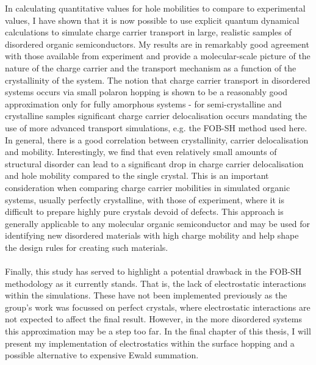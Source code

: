In calculating quantitative values for hole mobilities to compare to experimental values, I have shown that it is now possible to use explicit quantum dynamical calculations to simulate charge carrier transport in large, realistic samples of disordered organic semiconductors. My results are in remarkably good agreement with those available from experiment and provide a molecular-scale picture of the nature of the charge carrier and the transport mechanism as a function of the crystallinity of the system. The notion that charge carrier transport in disordered systems occurs via small polaron hopping is shown to be a reasonably good approximation only for fully amorphous systems - for semi-crystalline and crystalline samples significant charge carrier delocalisation occurs mandating the use of more advanced transport simulations, e.g.  the FOB-SH method used here. In general, there is a good correlation between crystallinity, carrier delocalisation and mobility.  Interestingly, we find that even relatively small amounts of structural disorder can lead to a significant drop in charge carrier delocalisation and hole mobility compared to the single crystal. This is an important consideration when comparing charge carrier mobilities in simulated organic systems, usually perfectly crystalline, with those of experiment, where it is difficult to prepare highly pure crystals devoid of defects. This approach is generally applicable to any molecular organic semiconductor and may be used for identifying new disordered materials with high charge mobility and help shape the design rules for creating such materials. 
\\\\
Finally, this study has served to highlight a potential drawback in the FOB-SH methodology as it currently stands. That is, the lack of electrostatic interactions within the simulations. These have not been implemented previously as the group's work was focussed on perfect crystals, where electrostatic interactions are not expected to affect the final result. However, in the more disordered systems this approximation may be a step too far. In the final chapter of this thesis, I will present my implementation of electrostatics within the surface hopping and a possible alternative to expensive Ewald summation.



